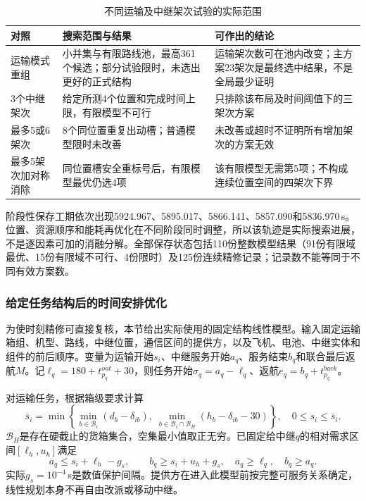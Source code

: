 \documentclass[withoutpreface,colorprint]{format}
\numberwithin{equation}{section}
\numberwithin{figure}{section}
\numberwithin{table}{section}
\begin{document}
\begin{table}[htbp]\centering\small
\caption{不同运输及中继架次试验的实际范围}\label{tab:q3_sortie_scope}
\begin{tabularx}{\linewidth}{p{3.0cm}XX}\toprule
对照 & 搜索范围与结果 & 可作出的结论\\\midrule
运输模式重组 & 小并集与有限路线池，最高361个候选；部分试验限时，未选出更好的正式结构 & 运输架次数可在池内改变；主方案23架次是最终选中结果，不是全局最少证明\\
3个中继架次 & 给定所测4个位置和完成时间上限，有限模型不可行 & 只排除该布局及时间阈值下的三架次方案\\
最多5或6架次 & 8个同位置重复出动槽；普通模型限时未改善 & 未改善或超时不证明所有增加架次的方案无效\\
最多5架次加对称消除 & 同位置槽安全重标号后，有限模型最优仍选4项 & 该有限模型无需第5项；不构成连续位置空间的四架次下界\\\bottomrule
\end{tabularx}
\end{table}

阶段性保存工期依次出现5924.967、5895.017、5866.141、5857.090和5836.970\,s。位置、资源顺序和能耗再优化在不同阶段同时调整，所以该轨迹是实际搜索进展，不是逐因素可加的消融分解。全部保存状态包括110份整数模型结果（91份有限域最优、15份有限域不可行、4份限时）及125份连续精修记录；记录数不能等同于不同有效方案数。

\subsubsection{给定任务结构后的时间安排优化}
\label{sec:q3_fixed_lp}
为使时刻精修可直接复核，本节给出实际使用的固定结构线性模型。输入固定运输箱组、机型、路线，中继位置，通信区间的提供方，以及飞机、电池、中继实体和组件的前后顺序。变量为运输开始$s_i$、中继服务开始$a_q$、服务结束$b_q$和联合最后返航$M$。记$\ell_q=180+t_{p_q}^{out}+30$，则任务开始$\sigma_q=a_q-\ell_q$、返航$e_q=b_q+t_{p_q}^{back}$。

对运输任务，根据箱级要求计算
\begin{equation}
 \bar s_i=\min\left\{\min_{b\in\mathcal B_i}(d_b-\delta_{ib}),\;
 \min_{b\in\mathcal B_i\cap\mathcal B_H}(h_b-\delta_{ib}-30)\right\},
 \quad 0\le s_i\le\bar s_i .
 \label{eq:q3_lp_start_bounds}
\end{equation}
$\mathcal B_H$是存在硬截止的货箱集合，空集最小值取正无穷。已固定给中继$q$的相对需求区间$[\ell_h,u_h]$满足
\begin{equation}
 a_q\le s_i+\ell_h-g_s,\qquad b_q\ge s_i+u_h+g_s,
 \quad a_q\ge\ell_q,\quad b_q\ge a_q .
 \label{eq:q3_lp_coverage}
\end{equation}
实际$g_s=10^{-4}$\,s是数值保护间隔。提供方在进入此模型前按完整可服务关系确定，线性规划本身不再自由改派或移动中继。
\end{document}
